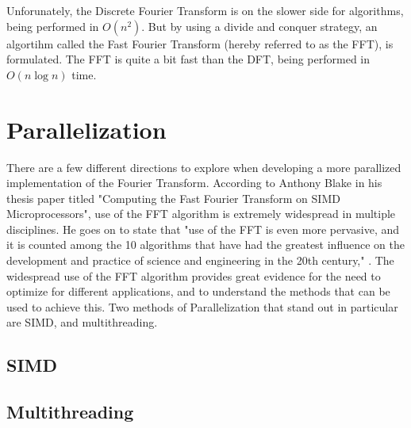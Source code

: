\documentclass[12pt]{extarticle}
\begin{document}
    Unforunately, the Discrete Fourier Transform is on the slower side for algorithms, being performed in $O(n^2)$.
    But by using a divide and conquer strategy, an algortihm called the Fast Fourier Transform (hereby referred to as the FFT),
    is formulated. The FFT is quite a bit fast than the DFT, being performed in $O(n\log{}n)$ time.


\maketitle
\newpage
\section*{Parallelization} 
    
    There are a few different directions to explore when developing a more
    parallized implementation of the Fourier Transform. 
    According to Anthony Blake in his thesis paper titled "Computing the Fast Fourier Transform on SIMD Microprocessors",
    use of the FFT algorithm is extremely widespread in multiple disciplines. He goes on to state that 
    "use of the FFT is even more pervasive, and it is counted among the 10 algorithms that have had the greatest influence 
    on the development and practice of science and engineering in the 20th century," \cite{Blake:2012}.
    The widespread use of the FFT algorithm provides great evidence for the need to optimize for different applications,
    and to understand the methods that can be used to achieve this.
    Two methods of Parallelization that stand out in particular are SIMD, and multithreading.

\subsection*{SIMD} 

\subsection*{Multithreading} 


\end{document}
